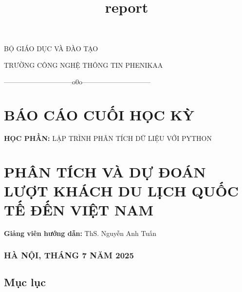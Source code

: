 \documentclass[11pt]{article}
\title{report}
\begin{document}
    
    \maketitle
    
    

    
    BỘ GIÁO DỤC VÀ ĐÀO TẠO

TRƯỜNG CÔNG NGHỆ THÔNG TIN PHENIKAA

------------------------------o0o------------------------------

\section{BÁO CÁO CUỐI HỌC
KỲ}\label{buxe1o-cuxe1o-cuux1ed1i-hux1ecdc-kux1ef3}

\textbf{HỌC PHẦN:} LẬP TRÌNH PHÂN TÍCH DỮ LIỆU VỚI PYTHON

\section{PHÂN TÍCH VÀ DỰ ĐOÁN LƯỢT KHÁCH DU LỊCH QUỐC TẾ ĐẾN VIỆT
NAM}\label{phuxe2n-tuxedch-vuxe0-dux1ef1-ux111ouxe1n-lux1b0ux1ee3t-khuxe1ch-du-lux1ecbch-quux1ed1c-tux1ebf-ux111ux1ebfn-viux1ec7t-nam}

\textbf{Giảng viên hướng dẫn:} ThS. Nguyễn Anh Tuấn

\subsubsection{HÀ NỘI, THÁNG 7 NĂM
2025}\label{huxe0-nux1ed9i-thuxe1ng-7-nux103m-2025}

    \subsection{Mục lục}\label{mux1ee5c-lux1ee5c}
\end{document}
